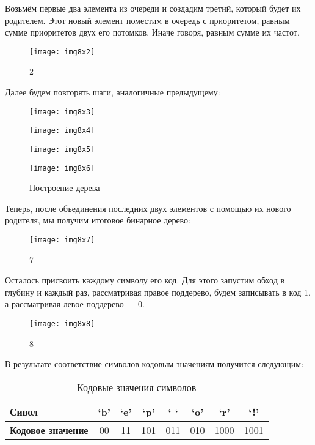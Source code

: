 Возьмём первые два элемента из очереди и создадим третий, который будет их
родителем. Этот новый элемент поместим в очередь с приоритетом, равным сумме
приоритетов двух его потомков. Иначе говоря, равным сумме их частот.

\begin{figure}[!htbp]
  \centering
  \texttt{[image: img8x2]}
  \caption{2}\label{img:8x2}
\end{figure}
Далее будем повторять шаги, аналогичные предыдущему:

\begin{figure}[!htbp]
  \centering
  \texttt{[image: img8x3]}
  \label{img:8x3}

  \texttt{[image: img8x4]}
  \label{img:8x4}

  \texttt{[image: img8x5]}
  \label{img:8x5}

  \texttt{[image: img8x6]}
  \caption{Построение дерева}\label{img:8x6}
\end{figure}

Теперь, после объединения последних двух элементов с помощью их нового
родителя, мы получим итоговое бинарное дерево:
\begin{figure}[!htbp]
  \centering
  \texttt{[image: img8x7]}
  \caption{7}\label{img:8x7}
\end{figure}
Осталось присвоить каждому символу его код. Для этого запустим обход в
глубину и каждый раз, рассматривая правое поддерево, будем записывать в код
1, а рассматривая левое поддерево — 0.

\begin{figure}[!htbp]
  \centering
  \texttt{[image: img8x8]}
  \caption{8}\label{img:8x8}
\end{figure}

В результате соответствие символов кодовым значениям получится следующим:
\begin{table} [!htbp]%
  \centering
  \parbox{12cm}%
  {%
    \caption{Кодовые значения символов}%
    \label{tabl:tab8x2}%
    \begin{SingleSpace}
    \begin{tabular}{|l|c|c|c|c|c|c|c|}
    \hline
    \textbf{Сивол}            & ‘b’ & ‘e’ & ‘p’ & ‘ ‘ & ‘o’ & ‘r’  & ‘!’  \\ \hline
    \rowcolor[HTML]{EFEFEF}
    \textbf{Кодовое значение} & 00  & 11  & 101 & 011 & 010 & 1000 & 1001 \\ \hline
    \end{tabular}
    \end{SingleSpace}
    }
\end{table}

